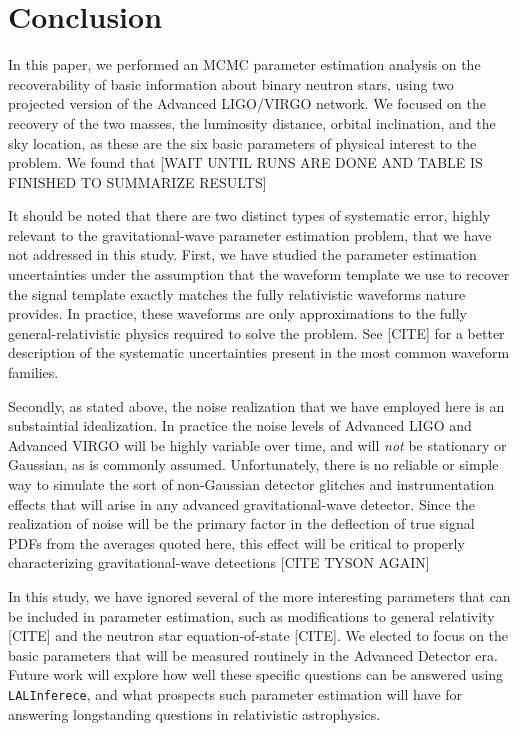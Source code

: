 \documentclass[11pt,a4paper]{emulateapj}
\newcommand{\carl}[1]{{\color{red}  #1}}
\begin{document}
\section{Conclusion}
\label{conclusionSection}

In this paper, we performed an MCMC parameter estimation analysis on the recoverability of basic information about binary neutron stars, using two projected version of the Advanced LIGO/VIRGO network.  We focused on the recovery of the two masses, the luminosity distance, orbital inclination, and the sky location, as these are the six basic parameters of physical interest to the problem.  We found that \carl{[WAIT UNTIL RUNS ARE DONE AND TABLE IS FINISHED TO SUMMARIZE RESULTS]}

It should be noted that there are two distinct types of systematic error, highly relevant to the gravitational-wave parameter estimation problem, that we have not addressed in this study.  First, we have studied the parameter estimation uncertainties under the assumption that the waveform template we use to recover the signal template exactly matches the fully relativistic waveforms nature provides.  In practice, these waveforms are only approximations to the fully general-relativistic physics required to solve the problem.  See \carl{[CITE]} for a better description of the systematic uncertainties present in the most common waveform families.

Secondly, as stated above, the noise realization that we have employed here is an substaintial idealization.  In practice the noise levels of Advanced LIGO and Advanced VIRGO will be highly variable over time, and will \emph{not} be stationary or Gaussian, as is commonly assumed.  Unfortunately, there is no reliable or simple way to simulate the sort of non-Gaussian detector glitches and instrumentation effects that will arise in any advanced gravitational-wave detector.  Since the realization of noise will be the primary factor in the deflection of true signal PDFs from the averages quoted here, this effect will be critical to properly characterizing gravitational-wave detections \carl{[CITE TYSON AGAIN]}

In this study, we have ignored several of the more interesting parameters that can be included in parameter estimation, such as modifications to general relativity \carl{[CITE]} and the neutron star equation-of-state \carl{[CITE]}.  We elected to focus on the basic parameters that will be measured routinely in the Advanced Detector era.  Future work will explore how well these specific questions can be answered using \texttt{LALInferece}, and what prospects such parameter estimation will have for answering longstanding questions in relativistic astrophysics.


{}
\end{document}

